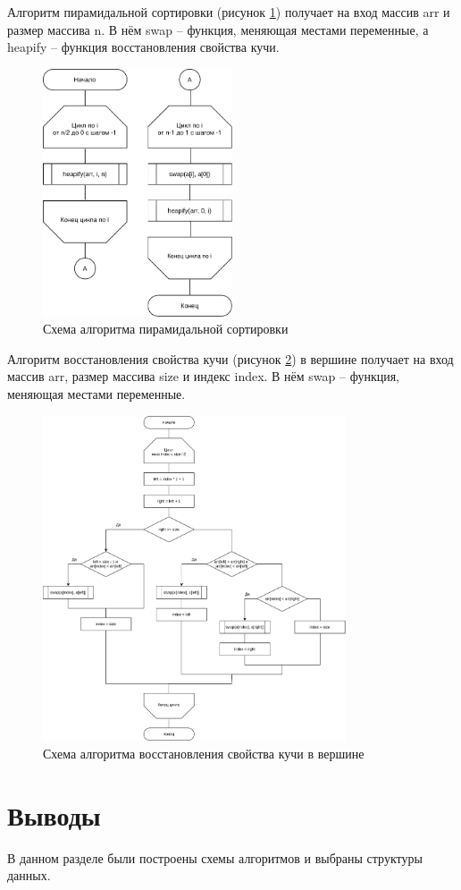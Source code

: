Алгоритм пирамидальной сортировки (рисунок \ref{fig:sort}) получает на вход массив arr и размер массива n. В нём swap -- функция, меняющая местами переменные, а heapify -- функция восстановления свойства кучи.

\begin{figure}[h!]
	\centering
	\includegraphics[width=0.5\textwidth]{tex_parts/sort.pdf}
	\caption{\label{fig:sort}Схема алгоритма пирамидальной сортировки}
\end{figure}

\clearpage

Алгоритм восстановления свойства кучи (рисунок \ref{fig:heap}) в вершине получает на вход массив arr, размер массива size и индекс index. В нём swap -- функция, меняющая местами переменные.

\begin{figure}[h!]
	\centering
	\includegraphics[width=0.8\textwidth]{tex_parts/heapify.pdf}
	\caption{\label{fig:heap}Схема алгоритма восстановления свойства кучи в вершине}
\end{figure}

\section{Выводы}

В данном разделе были построены схемы алгоритмов и выбраны структуры данных.

